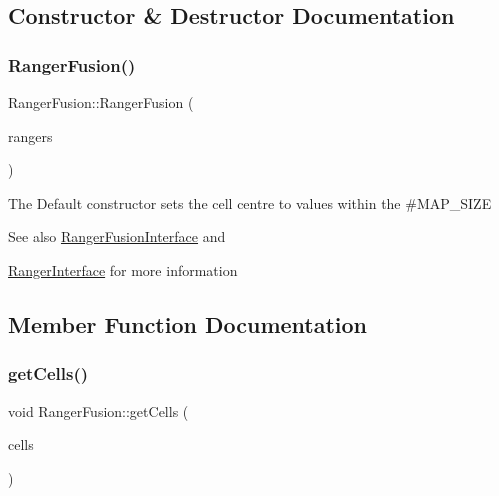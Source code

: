 \subsection{Constructor \& Destructor Documentation}
\mbox{\label{classRangerFusion_ae06d13fa52742f42e138b386e5022168}} 
\subsubsection{\texorpdfstring{Ranger\+Fusion()}{RangerFusion()}}
{\footnotesize\ttfamily Ranger\+Fusion\+::\+Ranger\+Fusion (\begin{DoxyParamCaption}\item[{std\+::vector$<$ \hyperlink{classRangerInterface}{Ranger\+Interface} $\ast$$>$}]{rangers }\end{DoxyParamCaption})}

The Default constructor sets the cell centre to values within the \#\+M\+A\+P\+\_\+\+S\+I\+ZE~\newline
\begin{DoxySeeAlso}{See also}
\hyperlink{classRangerFusionInterface}{Ranger\+Fusion\+Interface} and 

\hyperlink{classRangerInterface}{Ranger\+Interface} for more information 
\end{DoxySeeAlso}


\subsection{Member Function Documentation}
\mbox{\label{classRangerFusion_aaf0f90048ff744580eeb73a2bf3a38f7}} 
\subsubsection{\texorpdfstring{get\+Cells()}{getCells()}}
{\footnotesize\ttfamily void Ranger\+Fusion\+::get\+Cells (\begin{DoxyParamCaption}\item[{std\+::vector$<$ \hyperlink{classCell}{Cell} $\ast$$>$ \&}]{cells }\end{DoxyParamCaption})}




